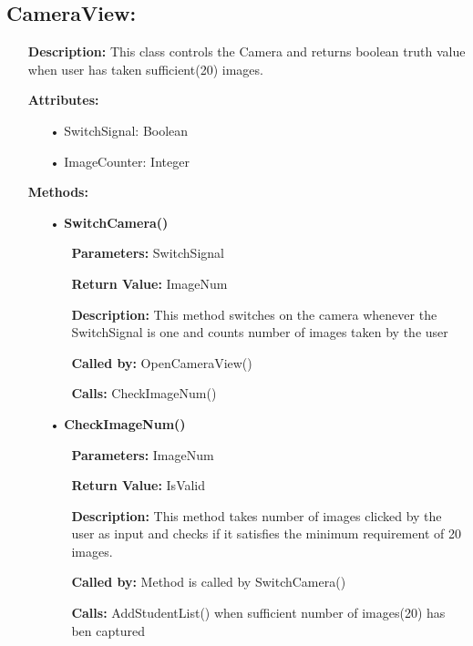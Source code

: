 \documentclass{scrreprt}
\begin{document}
\subsection{CameraView: }
\begin{enumerate}
\item[] \textbf{Description:} This class controls the Camera and returns boolean truth value when user has taken sufficient(20) images.
\item[] \textbf{Attributes:} 
\begin{itemize}
\item [•] SwitchSignal: Boolean
\item[•] ImageCounter: Integer
\end{itemize}
\item[] \textbf{Methods:}
\begin{itemize}
\item [•] \textbf{SwitchCamera()}
\begin{itemize}
\item [] \textbf{Parameters:} SwitchSignal
\item [] \textbf{Return Value:} ImageNum
\item [] \textbf{Description:} This method switches on the camera whenever the SwitchSignal is one and counts number of images taken by the user
\item [] \textbf{Called by:} OpenCameraView()
\item [] \textbf{Calls:} CheckImageNum()
\end{itemize}
\item [•] \textbf{CheckImageNum()}
\begin{itemize}
\item [] \textbf{Parameters:} ImageNum
\item [] \textbf{Return Value:} IsValid
\item [] \textbf{Description:} This method takes number of images clicked by the user as input and checks if it satisfies the minimum requirement of 20 images.
\item [] \textbf{Called by:} Method is called by SwitchCamera()
\item [] \textbf{Calls:} AddStudentList() when sufficient number of images(20) has ben captured
\end{itemize}
\end{itemize}
\end{enumerate}
\end{document}
